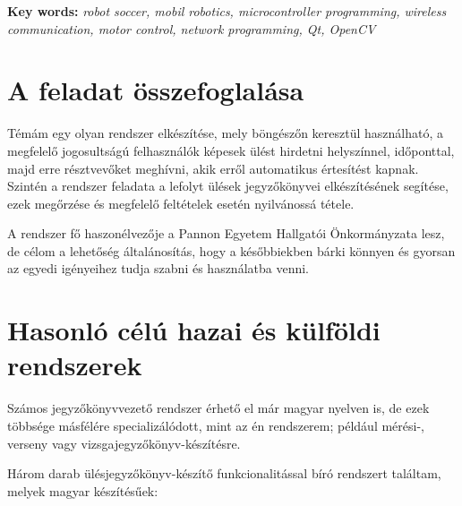 \documentclass[a4paper,12pt,oneside]{report}
\begin{document}
{\bf Key words:} {\it robot soccer, mobil robotics, microcontroller programming,
wireless communication, motor control, network programming, Qt, OpenCV }
\newpage
\setcounter{page}{1} %
\pagestyle{plain}

\listoftodos

\setcounter{secnumdepth}{3} %

\renewcommand{\thefigure}{\arabic{figure}}

\setcounter{tocdepth}{3} %
\tableofcontents
\thispagestyle{empty}
\pagebreak

\section{A feladat összefoglalása}

Témám egy olyan rendszer elkészítése, mely böngészőn keresztül használható, a megfelelő jogosultságú felhasználók képesek ülést hirdetni helyszínnel, időponttal, majd erre résztvevőket meghívni, akik erről automatikus értesítést kapnak. Szintén a rendszer feladata a lefolyt ülések jegyzőkönyvei elkészítésének segítése, ezek megőrzése és megfelelő feltételek esetén nyilvánossá tétele.

A rendszer fő haszonélvezője a Pannon Egyetem Hallgatói Önkormányzata lesz, de célom a lehetőség általánosítás, hogy a későbbiekben bárki könnyen és gyorsan az egyedi igényeihez tudja szabni és használatba venni.

\section{Hasonló célú hazai és külföldi rendszerek}

Számos jegyzőkönyvvezető rendszer érhető el már magyar nyelven is, de ezek többsége másfélére specializálódott, mint az én rendszerem; például mérési-, verseny vagy vizsgajegyzőkönyv-készítésre.

Három darab ülésjegyzőkönyv-készítő funkcionalitással bíró rendszert találtam, melyek magyar készítésűek:
\end{document}
